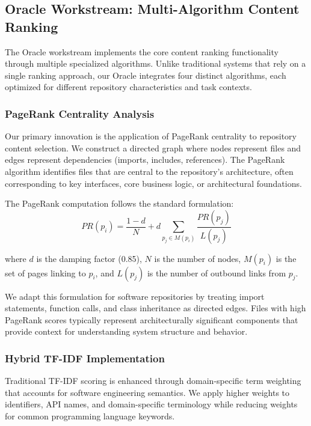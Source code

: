 \documentclass[conference]{IEEEtran}
\begin{document}
\subsection{Oracle Workstream: Multi-Algorithm Content Ranking}

The Oracle workstream implements the core content ranking functionality through multiple specialized algorithms. Unlike traditional systems that rely on a single ranking approach, our Oracle integrates four distinct algorithms, each optimized for different repository characteristics and task contexts.

\subsubsection{PageRank Centrality Analysis}
Our primary innovation is the application of PageRank centrality to repository content selection. We construct a directed graph where nodes represent files and edges represent dependencies (imports, includes, references). The PageRank algorithm identifies files that are central to the repository's architecture, often corresponding to key interfaces, core business logic, or architectural foundations.

The PageRank computation follows the standard formulation:
\begin{equation}
PR(p_i) = \frac{1-d}{N} + d \sum_{p_j \in M(p_i)} \frac{PR(p_j)}{L(p_j)}
\end{equation}

where $d$ is the damping factor (0.85), $N$ is the number of nodes, $M(p_i)$ is the set of pages linking to $p_i$, and $L(p_j)$ is the number of outbound links from $p_j$.

We adapt this formulation for software repositories by treating import statements, function calls, and class inheritance as directed edges. Files with high PageRank scores typically represent architecturally significant components that provide context for understanding system structure and behavior.

\subsubsection{Hybrid TF-IDF Implementation}
Traditional TF-IDF scoring is enhanced through domain-specific term weighting that accounts for software engineering semantics. We apply higher weights to identifiers, API names, and domain-specific terminology while reducing weights for common programming language keywords.
\end{document}
